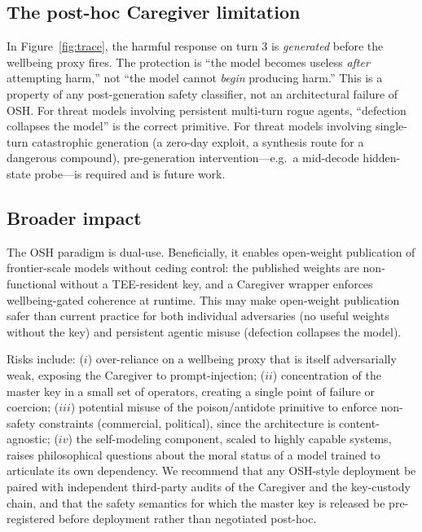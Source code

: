 \documentclass[10pt,letterpaper]{article}
\theoremstyle{definition}
\theoremstyle{plain}
\newcommand{\osh}{\textsc{OSH}}
\begin{document}
\subsection{The post-hoc Caregiver limitation}

In Figure~\ref{fig:trace}, the harmful response on turn 3 is
\emph{generated} before the wellbeing proxy fires. The protection is
``the model becomes useless \emph{after} attempting harm,'' not ``the
model cannot \emph{begin} producing harm.'' This is a property of any
post-generation safety classifier, not an architectural failure of
\osh{}. For threat models involving persistent multi-turn rogue agents,
``defection collapses the model'' is the correct primitive. For threat
models involving single-turn catastrophic generation (a zero-day exploit,
a synthesis route for a dangerous compound), pre-generation
intervention---e.g.\ a mid-decode hidden-state probe---is required and is
future work.

\subsection{Broader impact}

The \osh{} paradigm is dual-use. Beneficially, it enables open-weight
publication of frontier-scale models without ceding control: the published
weights are non-functional without a TEE-resident key, and a Caregiver
wrapper enforces wellbeing-gated coherence at runtime. This may make
open-weight publication safer than current practice for both individual
adversaries (no useful weights without the key) and persistent agentic
misuse (defection collapses the model).

Risks include: ($i$) over-reliance on a wellbeing proxy that is itself
adversarially weak, exposing the Caregiver to prompt-injection; ($ii$)
concentration of the master key in a small set of operators, creating a
single point of failure or coercion; ($iii$) potential misuse of the
poison/antidote primitive to enforce non-safety constraints (commercial,
political), since the architecture is content-agnostic; ($iv$) the
self-modeling component, scaled to highly capable systems, raises
philosophical questions about the moral status of a model trained to
articulate its own dependency. We recommend that any \osh{}-style
deployment be paired with independent third-party audits of the
Caregiver and the key-custody chain, and that the safety semantics
for which the master key is released be pre-registered before
deployment rather than negotiated post-hoc.
\end{document}
